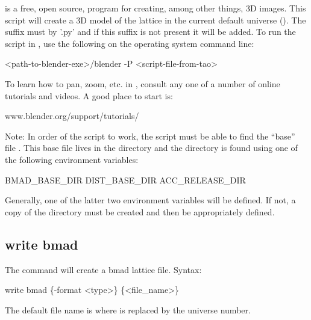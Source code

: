 {{{{{{{{{{{{ is a free, open source, program for creating, among other things, 3D images. This
script will create a 3D model of the lattice in the current default universe ().
The suffix must by '.py' and if this suffix is not present it will be added. To run the script in
, use the following on the operating system command line:
\begin{example}
  <path-to-blender-exe>/blender -P <script-file-from-tao>
\end{example}
To learn how to pan, zoom, etc. in , consult any one of a number of online tutorials and
videos. A good place to start is:
\begin{example}
  www.blender.org/support/tutorials/  
\end{example}
Note: In order of the script to work, the script must be able to find the ``base'' file
. This base file lives in the  directory and the 
directory is found using one of the following environment variables:
\begin{example}
  BMAD_BASE_DIR
  DIST_BASE_DIR
  ACC_RELEASE_DIR
\end{example}
Generally, one of the latter two environment variables will be defined.  If not, a copy of the
\bmad directory must be created and then  be appropriately defined.


\subsection{write bmad}
\label{s:write.bmad}

The  command will create a bmad lattice file. Syntax:
\begin{example}
    write bmad \{-format <type>\} \{<file_name>\} 
\end{example}

The default file name is  where \vn{\#} is replaced by the universe number. 

}}}}}}}}}}}}

